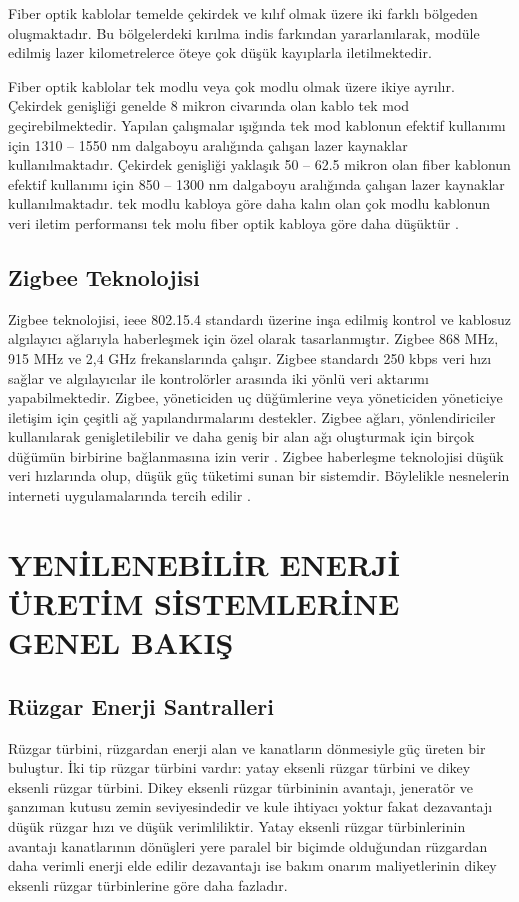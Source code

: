 Fiber optik kablolar temelde çekirdek ve kılıf olmak üzere iki farklı bölgeden oluşmaktadır. Bu bölgelerdeki kırılma indis farkından yararlanılarak, modüle edilmiş lazer kilometrelerce öteye çok düşük kayıplarla iletilmektedir. \cite{agrawal2012fiber}

Fiber optik kablolar tek modlu veya çok modlu olmak üzere ikiye ayrılır. Çekirdek genişliği genelde 8 mikron civarında olan kablo tek mod geçirebilmektedir. Yapılan çalışmalar ışığında tek mod kablonun efektif kullanımı için 1310 -- 1550 nm dalgaboyu aralığında çalışan lazer kaynaklar kullanılmaktadır. Çekirdek genişliği yaklaşık 50 -- 62.5 mikron olan fiber kablonun efektif kullanımı için 850 -- 1300 nm dalgaboyu aralığında çalışan lazer kaynaklar kullanılmaktadır. tek modlu kabloya göre daha kalın olan çok modlu kablonun veri iletim performansı tek molu fiber optik kabloya göre daha düşüktür \cite{keiser2000optical}. 

\subsection{Zigbee Teknolojisi}


Zigbee teknolojisi, \gls{ieee} 802.15.4 standardı üzerine inşa edilmiş kontrol ve kablosuz algılayıcı ağlarıyla haberleşmek için özel olarak tasarlanmıştır. Zigbee 868 MHz, 915 MHz ve 2,4 GHz frekanslarında çalışır. Zigbee standardı 250 kbps veri hızı sağlar ve algılayıcılar ile kontrolörler arasında iki yönlü veri aktarımı yapabilmektedir. Zigbee, yöneticiden uç düğümlerine veya yöneticiden yöneticiye iletişim için çeşitli ağ yapılandırmalarını destekler. Zigbee ağları, yönlendiriciler kullanılarak genişletilebilir ve daha geniş bir alan ağı oluşturmak için birçok düğümün birbirine bağlanmasına izin verir \cite{ramya2011study}. Zigbee haberleşme teknolojisi düşük veri hızlarında olup, düşük güç tüketimi sunan bir sistemdir. Böylelikle nesnelerin interneti uygulamalarında tercih edilir \cite{alliance2010zigbee}.



\section{YENİLENEBİLİR ENERJİ ÜRETİM SİSTEMLERİNE GENEL BAKIŞ}

\subsection{Rüzgar Enerji Santralleri}
Rüzgar türbini,  rüzgardan  enerji alan ve kanatların dönmesiyle güç üreten bir buluştur. İki tip rüzgar türbini vardır: yatay eksenli rüzgar türbini ve dikey eksenli rüzgar türbini. Dikey eksenli rüzgar türbininin avantajı, jeneratör ve şanzıman kutusu zemin seviyesindedir ve kule ihtiyacı yoktur fakat dezavantajı düşük rüzgar hızı ve düşük verimliliktir. Yatay eksenli rüzgar türbinlerinin avantajı kanatlarının dönüşleri yere paralel bir biçimde olduğundan rüzgardan daha verimli enerji elde edilir dezavantajı ise bakım onarım maliyetlerinin dikey eksenli rüzgar türbinlerine göre daha fazladır. \cite{Ghenai2012LifeCA}

